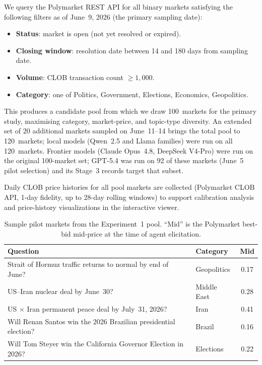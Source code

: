\documentclass{article} %
\begin{document}
We query the Polymarket REST API for all binary markets satisfying the following filters
as of June~9, 2026 (the primary sampling date):

\begin{itemize}
  \item \textbf{Status}: market is open (not yet resolved or expired).
  \item \textbf{Closing window}: resolution date between 14 and 180 days from sampling date.
  \item \textbf{Volume}: CLOB transaction count $\geq 1{,}000$.
  \item \textbf{Category}: one of Politics, Government, Elections, Economics, Geopolitics.
\end{itemize}

This produces a candidate pool from which we draw 100~markets for the primary study,
maximising category, market-price, and topic-type diversity.  An extended set of 20
additional markets sampled on June~11--14 brings the total pool to 120~markets; local
models (Qwen~2.5 and Llama families) were run on all 120~markets.
Frontier models (Claude Opus~4.8, DeepSeek V4-Pro) were run on the original 100-market
set; GPT-5.4 was run on 92 of these markets (June~5 pilot selection) and its
Stage~3 records target that subset.

Daily CLOB price histories for all pool markets are collected (Polymarket CLOB API,
1-day fidelity, up to 28-day rolling windows) to support calibration analysis and
price-history visualizations in the interactive viewer.

\begin{table}[h]
\centering
\caption{Sample pilot markets from the Experiment~1 pool.  ``Mid'' is the Polymarket
best-bid mid-price at the time of agent elicitation.}
\label{tab:markets}
\small
\begin{tabular}{p{6.2cm} l c}
\toprule
\textbf{Question} & \textbf{Category} & \textbf{Mid} \\
\midrule
Strait of Hormuz traffic returns to normal by end of June? & Geopolitics & 0.17 \\
US--Iran nuclear deal by June~30?                          & Middle East & 0.28 \\
US $\times$ Iran permanent peace deal by July~31, 2026?    & Iran        & 0.41 \\
Will Renan Santos win the 2026 Brazilian presidential election? & Brazil  & 0.16 \\
Will Tom Steyer win the California Governor Election in 2026?   & Elections & 0.22 \\
\bottomrule
\end{tabular}
\end{table}
\end{document}

